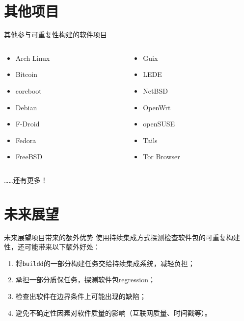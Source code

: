 \documentclass{beamer}
\begin{document}
\section{其他项目}
\begin{frame}{其他参与可重复性构建的软件项目}
\begin{columns}
\begin{column}{.5\textwidth}
\begin{itemize}
  \item Arch Linux
  \item Bitcoin
  \item coreboot
  \item Debian
  \item F-Droid
  \item Fedora
  \item FreeBSD
\end{itemize}
\end{column}
\begin{column}{.5\textwidth}
\begin{itemize}

  \item Guix
  \item LEDE
  \item NetBSD
  \item OpenWrt
  \item openSUSE
  \item Tails
  \item Tor Browser
\end{itemize}
\end{column}
\end{columns}

\vfill
\begin{center}
……还有更多！
\end{center}
\end{frame}
\section{未来展望}
\begin{frame}{未来展望}{项目带来的额外优势}
使用持续集成方式探测检查软件包的可重复构建性，还可能带来以下额外好处：
\begin{enumerate}
\item 将\texttt{buildd}的一部分构建任务交给持续集成系统，减轻负担；
\item 承担一部分质保任务，探测软件包regression；
\item 检查出软件在边界条件上可能出现的缺陷；
\item 避免不确定性因素对软件质量的影响（互联网质量、时间戳等）。
\end{enumerate}
\vfill
\end{frame}
\end{document}
